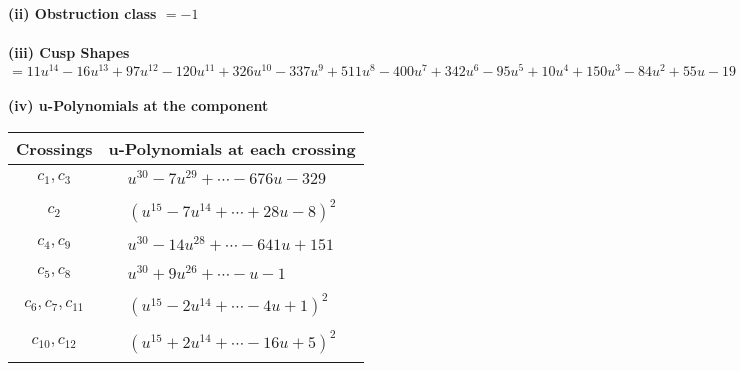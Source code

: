 \documentclass[1p]{elsarticle_modified}
\theoremstyle{definition}
\begin{document}
\flushleft \textbf{(ii) Obstruction class $= -1$}\\~\\
\flushleft \textbf{(iii) Cusp Shapes $= 11 u^{14}-16 u^{13}+97 u^{12}-120 u^{11}+326 u^{10}-337 u^9+511 u^8-400 u^7+342 u^6-95 u^5+10 u^4+150 u^3-84 u^2+55 u-19$}\\~\\
\newpage\renewcommand{\arraystretch}{1}
\flushleft \textbf{(iv) u-Polynomials at the component}\newline \\
\begin{tabular}{m{50pt}|m{274pt}}
Crossings & \hspace{64pt}u-Polynomials at each crossing \\
\hline $$\begin{aligned}c_{1},c_{3}\end{aligned}$$&$\begin{aligned}
&u^{30}-7 u^{29}+\cdots-676 u-329
\end{aligned}$\\
\hline $$\begin{aligned}c_{2}\end{aligned}$$&$\begin{aligned}
&(u^{15}-7 u^{14}+\cdots+28 u-8)^{2}
\end{aligned}$\\
\hline $$\begin{aligned}c_{4},c_{9}\end{aligned}$$&$\begin{aligned}
&u^{30}-14 u^{28}+\cdots-641 u+151
\end{aligned}$\\
\hline $$\begin{aligned}c_{5},c_{8}\end{aligned}$$&$\begin{aligned}
&u^{30}+9 u^{26}+\cdots- u-1
\end{aligned}$\\
\hline $$\begin{aligned}c_{6},c_{7},c_{11}\end{aligned}$$&$\begin{aligned}
&(u^{15}-2 u^{14}+\cdots-4 u+1)^{2}
\end{aligned}$\\
\hline $$\begin{aligned}c_{10},c_{12}\end{aligned}$$&$\begin{aligned}
&(u^{15}+2 u^{14}+\cdots-16 u+5)^{2}
\end{aligned}$\\
\hline
\end{tabular}\\~\\
\end{document}
